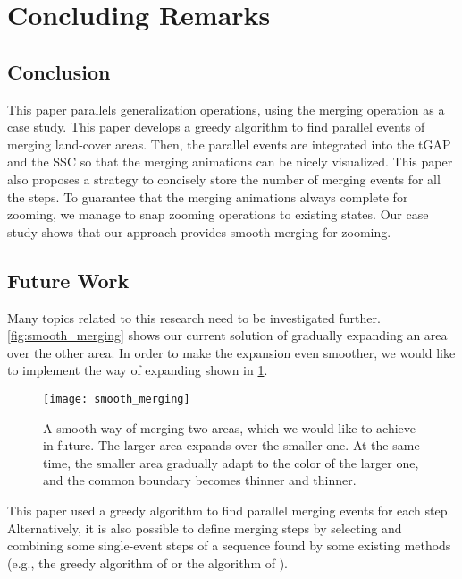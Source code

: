\documentclass[ijgi,article,submit,moreauthors,pdftex]{Definitions/mdpi}
\begin{document}
\section{Concluding Remarks}
\label{sec:concluding_remarks}

\subsection{Conclusion}
This paper parallels generalization operations,
using the merging operation as a case study. 
This paper develops a greedy algorithm to find parallel events of 
merging land-cover areas.
Then, the parallel events are integrated into 
the tGAP and the SSC so that the merging animations can be nicely visualized.
This paper also proposes a strategy 
to concisely store the number of merging events for all the steps.
To guarantee that the merging animations always complete for zooming, 
we manage to snap zooming operations to existing states.
Our case study shows that 
our approach provides smooth merging for zooming.


\subsection{Future Work}

Many topics related to this research need to be investigated further.
\fig\ref{fig:smooth_merging} shows our current solution of
gradually expanding an area over the other area.
In order to make the expansion even smoother,
we would like to implement the way of expanding
shown in \fig\ref{fig:smooth_merging_future}.

\begin{figure}[tb]
\centering
\texttt{[image: smooth\_merging]}
\caption{A smooth way of merging two areas, 
    which we would like to achieve in future.
    The larger area expands over the smaller one.
    At the same time, 
    the smaller area gradually adapt to the color of the larger one,
    and the common boundary becomes thinner and thinner.}
\label{fig:smooth_merging_future}
\end{figure}

This paper used a greedy algorithm 
to find parallel merging events for each step.
Alternatively, it is also possible to define merging steps 
by selecting and combining some single-event steps of a sequence found 
by some existing methods
(e.g., the greedy algorithm of \citet{vanOosterom2005}
or the \Astar algorithm of \citet[]{Peng2019Thesis}).
\end{document}
